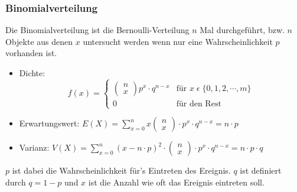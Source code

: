 \documentclass[a4paper]{scrartcl}
\begin{document}
            \subsubsection{Binomialverteilung}
                Die Binomialverteilung ist die Bernoulli-Verteilung \(n\) Mal durchgeführt, bzw. \(n\) Objekte aus denen \(x\) untersucht werden wenn
                nur eine Wahrscheinlichkeit \(p\) vorhanden ist. 
                \begin{itemize}
                    \item Dichte: \[f(x)=
                                                        \begin{cases}
                                                            \begin{pmatrix} n \\ x \end{pmatrix} p^x \cdot q^{n - x} & \text{für } x \; \epsilon \; \{0,1,2,\cdots, m\} \\
                                                            0     & \text{für den Rest} 
                                                        \end{cases}
                                                        \] 
                    \item Erwartungswert: \(E(X) = \sum\limits_{x =0}^n x \begin{pmatrix} n \\ x \end{pmatrix} \cdot p^x \cdot q^{n - x} = n \cdot p \)
                    \item Varianz: \(V(X) = \sum\limits_{x=0}^n (x - n \cdot p)^2 \cdot \begin{pmatrix} n \\ x \end{pmatrix} \cdot p^x \cdot q^{n - x} = n \cdot p \cdot q\) 
                \end{itemize}
                \(p\) ist dabei  die Wahrscheinlichkeit für's Eintreten des Ereignis. \(q\) ist definiert durch \(q = 1 - p\) und \(x\) ist die Anzahl wie oft das Ereignis eintreten soll.  
\end{document}
